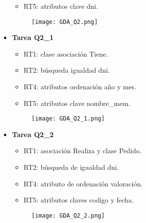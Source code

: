 \documentclass[a4paper]{article}
\begin{document}
\begin{itemize}
\begin{itemize}
        \item RT5: atributos clave dni.

    \end{itemize}

    \begin{figure}[H]
        \centering
        \texttt{[image: GDA\_Q2.png]}
        \label{fig:Q2}
    \end{figure}

\newpage

    \item \textbf{\large{Tarea Q2\_1}}

    \begin{itemize}

        \item RT1: clase asociación Tiene.

        \item RT2: búsqueda igualdad dni.

        \item RT4: atributos ordenación año y mes.

        \item RT5: atributos clave nombre\_mem.

    \end{itemize}

    \begin{figure}[H]
        \centering
        \texttt{[image: GDA\_Q2\_1.png]}
        \label{fig:Q2_1}
    \end{figure}

    \item \textbf{\large{Tarea Q2\_2}}

    \begin{itemize}

        \item RT1: asociación Realiza y clase Pedido.

        \item RT2: búsqueda de igualdad dni.

        \item RT4: atributo de ordenación valoración.

        \item RT5: atributos claves codigo y fecha.

    \end{itemize}

    \begin{figure}[H]
        \centering
        \texttt{[image: GDA\_Q2\_2.png]}
        \label{fig:Q2_2}
    \end{figure}


\end{itemize}
\end{document}

